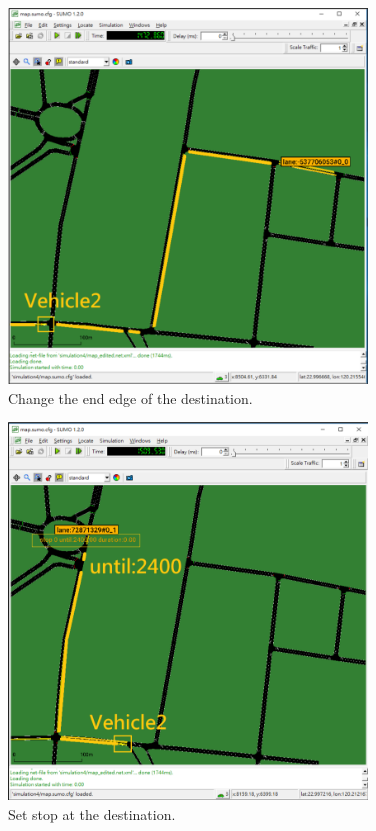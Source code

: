 \documentclass[12pt]{ksthesis}
\begin{document}
\begin{thesis}
{\begin{figure}[t!]
\centering
\includegraphics[width=0.85\textwidth]{./Thesis_figures/F4-3_Change_endEdge.PNG}
\caption{\large Change the end edge of the destination.}
\vspace{0.5cm}
\label{Fig:Change_endEdge}
\end{figure}

\begin{figure}[H]
\centering
\includegraphics[width=0.85\textwidth]{./Thesis_figures/F4-4_setStop.PNG}
\caption{\large Set stop at the destination.}
\vspace{0.5cm}
\label{Fig:Set_stop}
\end{figure}


}
\end{thesis}
\end{document}
